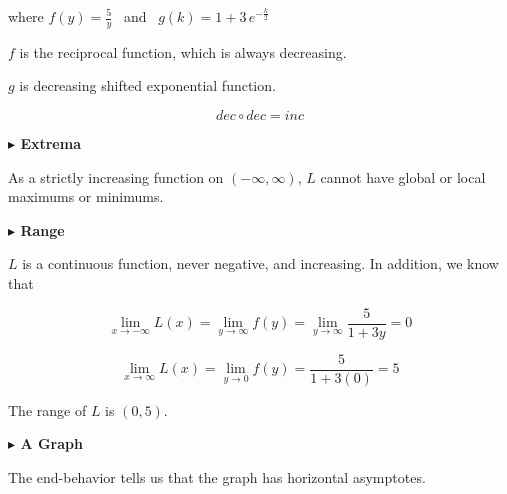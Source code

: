 \documentclass{ximera}
\begin{document}
where $f(y) =  \frac{5}{y}$  \, and  \, $g(k) = 1 + 3 \, e^{-\tfrac{k}{2}}$   

$f$ is the reciprocal function, which is always decreasing.

$g$ is decreasing shifted exponential function.


\[  dec \circ dec = inc  \]






















\textbf{\textcolor{blue!55!black}{$\blacktriangleright$ Extrema}} 


As a strictly increasing function on $(-\infty, \infty)$, $L$ cannot have global or local maximums or minimums. 










\textbf{\textcolor{blue!55!black}{$\blacktriangleright$ Range}} 



$L$ is a continuous function, never negative, and increasing. In addition, we know that 





\[  
\lim\limits_{x \to -\infty}L(x) = \lim\limits_{y \to \infty}f(y) = \lim\limits_{y \to \infty}\frac{5}{1 + 3 y} = 0
\]




\[  
\lim\limits_{x \to \infty}L(x) = \lim\limits_{y \to 0}f(y) = \frac{5}{1 + 3 (0)} = 5
\]








The range of $L$ is $(0, 5)$.













\textbf{\textcolor{blue!55!black}{$\blacktriangleright$ A Graph}} 





The end-behavior tells us that the graph has horizontal asymptotes.
\end{document}
